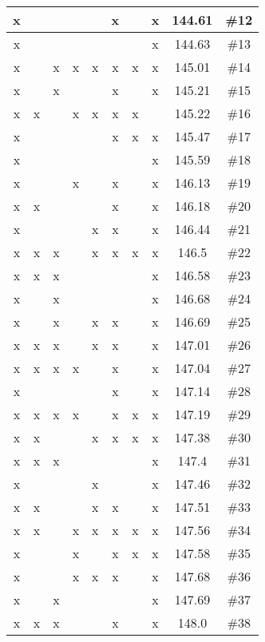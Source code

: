 \begin{center}
\begin{longtable}{|c|c|c|c|c|c|c|c|c|c|}
 x &  &  &  &  &  x &  &  x & 144.61 & \#12 \\ \hline
 x &  &  &  &  &  &  &  x & 144.63 & \#13 \\ \hline
 x &  &  x &  x &  x &  x &  x &  x & 145.01 & \#14 \\ \hline
 x &  &  x &  &  &  x &  &  x & 145.21 & \#15 \\ \hline
 x &  x &  &  x &  x &  x &  x &  & 145.22 & \#16 \\ \hline
 x &  &  &  &  &  x &  x &  x & 145.47 & \#17 \\ \hline
 x &  &  &  &  &  &  &  x & 145.59 & \#18 \\ \hline
 x &  &  &  x &  &  x &  &  x & 146.13 & \#19 \\ \hline
 x &  x &  &  &  &  x &  &  x & 146.18 & \#20 \\ \hline
 x &  &  &  &  x &  x &  &  x & 146.44 & \#21 \\ \hline
 x &  x &  x &  &  x &  x &  x &  x & 146.5 & \#22 \\ \hline
 x &  x &  x &  &  &  &  &  x & 146.58 & \#23 \\ \hline
 x &  &  x &  &  &  &  &  x & 146.68 & \#24 \\ \hline
 x &  &  x &  &  x &  x &  &  x & 146.69 & \#25 \\ \hline
 x &  x &  x &  &  x &  x &  &  x & 147.01 & \#26 \\ \hline
 x &  x &  x &  x &  &  x &  &  x & 147.04 & \#27 \\ \hline
 x &  &  &  &  &  x &  &  x & 147.14 & \#28 \\ \hline
 x &  x &  x &  x &  &  x &  x &  x & 147.19 & \#29 \\ \hline
 x &  x &  &  &  x &  x &  x &  x & 147.38 & \#30 \\ \hline
 x &  x &  x &  &  &  &  &  x & 147.4 & \#31 \\ \hline
 x &  &  &  &  x &  &  &  x & 147.46 & \#32 \\ \hline
 x &  x &  &  &  x &  x &  &  x & 147.51 & \#33 \\ \hline
 x &  x &  &  x &  x &  x &  x &  x & 147.56 & \#34 \\ \hline
 x &  &  &  x &  &  x &  x &  x & 147.58 & \#35 \\ \hline
 x &  &  &  x &  x &  x &  &  x & 147.68 & \#36 \\ \hline
 x &  &  x &  &  &  &  &  x & 147.69 & \#37 \\ \hline
 x &  x &  x &  &  &  x &  &  x & 148.0 & \#38 \\ \hline

\end{longtable}
\end{center}
